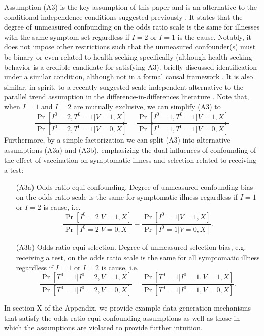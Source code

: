 \documentclass[11pt]{article}
\begin{document}
Assumption (A3) is the key assumption of this paper and is an alternative to the conditional independence conditions suggested previously \cite{schnitzer_estimands_2022}. It states that the degree of unmeasured confounding on the odds ratio scale is the same for illnesses with the same symptom set regardless if $I=2$ or $I=1$ is the cause. Notably, it does not impose other restrictions such that the unmeasured confounder(s) must be binary or even related to health-seeking specifically (although health-seeking behavior is a credible candidate for satisfying A3). \citeauthor{lewnard_measurement_2018} briefly discussed identification under a similar condition, although not in a formal causal framework \cite{lewnard_measurement_2018}. It is also similar, in spirit, to a recently suggested  scale-independent alternative to the parallel trend assumption in the difference-in-differences literature \cite{park_universal_2023,tchetgen_universal_2023}. Note that, when $I = 1$ and $I = 2$ are mutually exclusive, we can simplify (A3) to
\begin{equation}
    \frac{\Pr[I^0 = 2, T^0 = 1 | V = 1, X]}{\Pr[I^0 = 2, T^0 = 1 | V = 0, X]} =\frac{\Pr[I^0 = 1, T^0 = 1 | V = 1, X]}{\Pr[I^0 = 1, T^0 = 1 | V = 0, X]}
\end{equation}
Furthermore, by a simple factorization we can split (A3) into alternative assumptions (A3a) and (A3b), emphasizing the dual influences of confounding of the effect of vaccination on symptomatic illness and selection related to receiving a test:
\begin{itemize}
    \item[(A3a)] Odds ratio equi-confounding. Degree of unmeasured confounding bias on the odds ratio scale is the same for symptomatic illness regardless if $I=1$ or $I=2$ is cause, i.e. 
    $$\frac{\Pr[I^0 = 2 | V = 1, X]}{\Pr[I^0 = 2 | V = 0, X]} =\frac{\Pr[I^0 = 1 | V = 1, X]}{\Pr[I^0 = 1 | V = 0, X]}.$$
    \item[(A3b)] Odds ratio equi-selection. Degree of unmeasured selection bias, e.g. receiving a test, on the odds ratio scale is the same for all symptomatic illness regardless if $I=1$ or $I=2$ is cause, i.e. 
    $$\frac{\Pr[T^0 = 1 | I^0 = 2, V = 1, X]}{\Pr[T^0 = 1 | I^0 = 2, V = 0, X]} =\frac{\Pr[T^0 = 1 | I^0 = 1, V = 1, X]}{\Pr[T^0 = 1 | I^0 = 1, V = 0, X]}.$$
\end{itemize}
In section X of the Appendix, we provide example data generation mechanisms that satisfy the odds ratio equi-confounding assumptions as well as those in which the assumptions are violated to provide further intuition.
\end{document}
